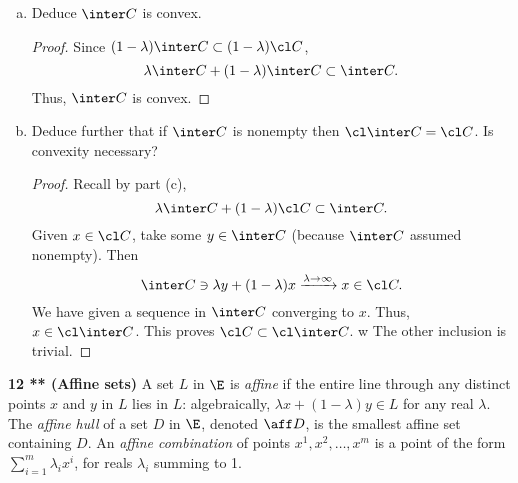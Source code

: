 \documentclass[12pt, letterpaper]{article}
\numberwithin{equation}{subsection}
\begin{document}
\begin{enumerate}[(a)]
\begin{proof}
$C$.
\end{proof}
\item Deduce $\inter C$ is convex.
\begin{proof}
Since $(1-\lambda)\inter C\subset (1-\lambda)\cl C$, 
\begin{equation*}
\lambda \inter C + (1-\lambda)\inter C \subset \inter C.
\end{equation*}
Thus, $\inter C$ is convex.
\end{proof}
\item Deduce further that if $\inter C$ is nonempty then $\cl\inter C=\cl C$.
Is convexity necessary?
\begin{proof}
Recall by part (c), 
\begin{equation*}
\lambda\inter C+ (1-\lambda)\cl C \subset \inter C.
\end{equation*}
Given $x\in\cl C$, take some $y\in \inter C$ (because $\inter C$ assumed 
nonempty). Then 
\begin{equation*}
\inter C \ni\lambda y + (1-\lambda) x \xrightarrow{\lambda\to\infty}{}
x \in \cl C.
\end{equation*}
We have given a sequence in $\inter C$ converging to $x$. Thus, 
$x\in\cl\inter C$. This proves $\cl C\subset \cl\inter C$. 
w
The other inclusion is trivial.
\end{proof}
\end{enumerate}
\textbf{12 ** (Affine sets)} A set $L$ in $\E$ is \textit{affine} if the 
entire line through any distinct points $x$ and $y$ in $L$ lies in $L$: 
algebraically, $\lambda x+(1-\lambda)y\in L$ for any real $\lambda$. 
The \textit{affine hull} of a set $D$ in $\E$, denoted $\aff D$, is the 
smallest affine set containing $D$. An \textit{affine combination} of 
points $x^1, x^2, \ldots, x^m$ is a point of the form $\sum_{i=1}^m 
\lambda_i x^i$, for reals $\lambda_i$ summing to 1.
\end{document}
